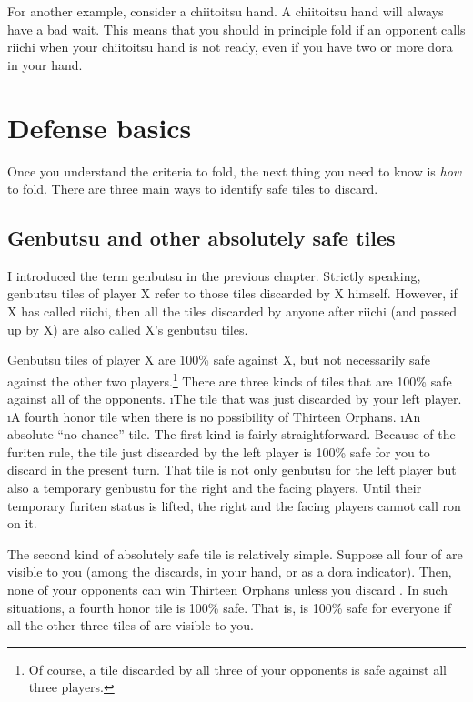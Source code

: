 \bigskip
For another example, consider a {\jap chiitoitsu} hand. A {\jap chiitoitsu} hand will always have a bad wait. This means that you should in principle fold if an opponent calls riichi when your {\jap chiitoitsu} hand is not ready, even if you have two or more {\jap dora} in your hand.

\section{Defense basics} \label{sec:defense}

Once you understand the criteria to fold, the next thing you need to know is \emph{how} to fold. There are three main ways to identify safe tiles to discard. 

\subsection{{\jap Genbutsu} and other absolutely safe tiles}  \label{sec:genbutsu_def}
I introduced the term {\jap genbutsu} in the previous chapter. Strictly speaking, {\jap genbutsu} tiles of player X refer to those tiles discarded by X himself. However, if X has called riichi, then all the tiles discarded by anyone after riichi (and passed up by X) are also called X's {\jap genbutsu} tiles. 

\bigskip
{\jap Genbutsu} tiles of player X are 100\% safe against X, but not necessarily safe against the other two players.\footnote{Of course, a tile discarded by all three of your opponents is safe against all three players.} There are three kinds of tiles that are 100\% safe against all of the opponents. 
\bi
\i The tile that was just discarded by your left player.
\i A fourth honor tile when there is no possibility of Thirteen Orphans.
\i An absolute ``no chance'' tile.
\ei
The first kind is fairly straightforward. Because of the {\jap furiten} rule, the tile just discarded by the left player is 100\% safe for you to discard in the present turn. That tile is not only {\jap genbutsu} for the left player but also a temporary {\jap genbustu} for the right and the facing players. Until their temporary {\jap furiten} status is lifted, the right and the facing players cannot call {\jap ron} on it. 

\bigskip
The second kind of absolutely safe tile is relatively simple. Suppose all four of {\LARGE{}} are visible to you (among the discards, in your hand, or as a {\jap dora} indicator). Then, none of your opponents can win Thirteen Orphans unless you discard {\LARGE{}}. In such situations, a fourth honor tile is 100\% safe. That is, {\LARGE\dong} is 100\% safe for everyone if all the other three tiles of {\LARGE\dong} are visible to you.

